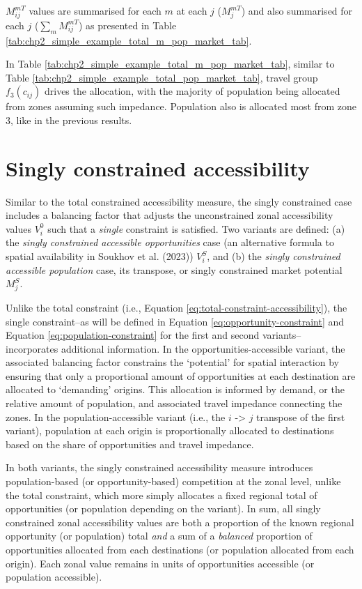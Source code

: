 \documentclass[
11pt, %
oneside, %
english, %
singlespacing, %
]{macthesis} %
\begin{document}
\(M^{mT}_{ij}\) values are summarised for each \(m\) at each \(j\) (\(M^{mT}_{j}\)) and also summarised for each \(j\) (\(\sum_m M^{mT}_{ij}\)) as presented in Table \ref{tab:chp2_simple_example_total_m_pop_market_tab}.



In Table \ref{tab:chp2_simple_example_total_m_pop_market_tab}, similar to Table \ref{tab:chp2_simple_example_total_pop_market_tab}, travel group \(f_3(c_{ij})\) drives the allocation, with the majority of population being allocated from zones assuming such impedance. Population also is allocated most from zone 3, like in the previous results.

\section{Singly constrained accessibility}\label{singly-constrained-accessibility}

Similar to the total constrained accessibility measure, the singly constrained case includes a balancing factor that adjusts the unconstrained zonal accessibility values \(V^0_i\) such that a \emph{single} constraint is satisfied. Two variants are defined: (a) the \emph{singly constrained accessible opportunities} case (an alternative formula to spatial availability in Soukhov et al. (2023)) \(V_{i}^{S}\), and (b) the \emph{singly constrained accessible population} case, its transpose, or singly constrained market potential \(M_{j}^{S}\).

Unlike the total constraint (i.e., Equation \ref{eq:total-constraint-accessibility}), the single constraint--as will be defined in Equation \ref{eq:opportunity-constraint} and Equation \ref{eq:population-constraint} for the first and second variants-- incorporates additional information. In the opportunities-accessible variant, the associated balancing factor constrains the `potential' for spatial interaction by ensuring that only a proportional amount of opportunities at each destination are allocated to `demanding' origins. This allocation is informed by demand, or the relative amount of population, and associated travel impedance connecting the zones. In the population-accessible variant (i.e., the \(i\) -\textgreater{} \(j\) transpose of the first variant), population at each origin is proportionally allocated to destinations based on the share of opportunities and travel impedance.

In both variants, the singly constrained accessibility measure introduces population-based (or opportunity-based) competition at the zonal level, unlike the total constraint, which more simply allocates a fixed regional total of opportunities (or population depending on the variant). In sum, all singly constrained zonal accessibility values are both a proportion of the known regional opportunity (or population) total \emph{and} a sum of a \emph{balanced} proportion of opportunities allocated from each destinations (or population allocated from each origin). Each zonal value remains in units of opportunities accessible (or population accessible).
\end{document}
